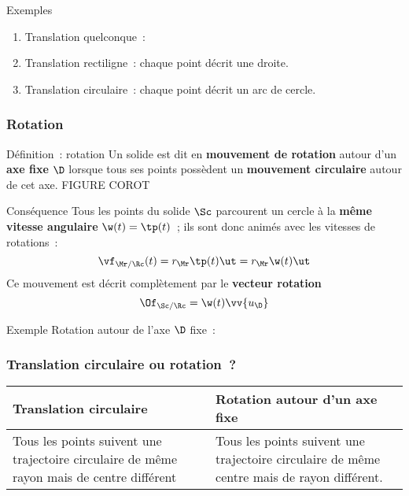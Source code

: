 \documentclass[../main/main.tex]{subfiles}
\begin{document}
\begin{rexem}{Exemples}
    \begin{enumerate}
        \item Translation quelconque~:
        \item Translation rectiligne~: chaque point décrit une droite.
        \item Translation circulaire~: chaque point décrit un arc de cercle.
    \end{enumerate}
\end{rexem}

\subsubsection{Rotation}
\begin{tdefi}{Définition~: rotation}
    Un solide est dit en \textbf{mouvement de rotation} autour d'un \textbf{axe
    fixe} $\D$ lorsque tous ses points possèdent un \textbf{mouvement
    circulaire} autour de cet axe.
    FIGURE COROT
\end{tdefi}
\begin{tcoro}{Conséquence}
    Tous les points du solide $\Sc$ parcourent un cercle à la \textbf{même
    vitesse angulaire} $\w(t) = \tp(t)$~; ils sont donc animés avec les vitesses
    de rotations~:
    \[\vf_{\Mr/\Rc}(t) = r_{\Mr}\tp(t)\ut = r_{\Mr}\w(t)\ut\]
    Ce mouvement est décrit complètement par le \textbf{vecteur rotation}
    \[\Of_{\Sc/\Rc} = \w(t)\vv{u_\D}\]
\end{tcoro}

\begin{rexem}{Exemple}
    Rotation autour de l'axe $\D$ fixe~:
\end{rexem}

\subsubsection{Translation circulaire ou rotation~?}
\begin{table}[!h]
    \centering
    \begin{tabularx}{.8\linewidth}{YY}
        \toprule
        Translation circulaire & Rotation autour d'un axe fixe
        \\\midrule
        Tous les points suivent une trajectoire circulaire de même rayon mais de
        centre différent & Tous les points suivent une trajectoire circulaire de
        même centre mais de rayon différent.
        \\\bottomrule
    \end{tabularx}
\end{table}
\end{document}

